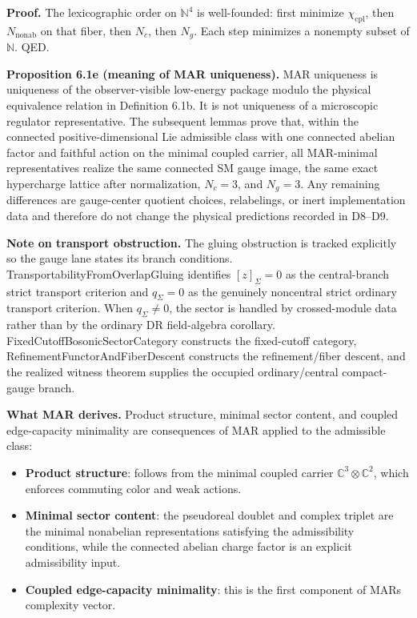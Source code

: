 \textbf{Proof.} The lexicographic order on \(\mathbb N^4\) is well-founded: first minimize \(\chi_{\mathrm{cpl}}\), then \(N_{\mathrm{nonab}}\) on that fiber, then \(N_c\), then \(N_g\). Each step minimizes a nonempty subset of \(\mathbb N\). QED.

\textbf{Proposition 6.1e (meaning of MAR uniqueness).} MAR uniqueness is uniqueness of the observer-visible low-energy package modulo the physical equivalence relation in Definition 6.1b. It is not uniqueness of a microscopic regulator representative. The subsequent lemmas prove that, within the connected positive-dimensional Lie admissible class with one connected abelian factor and faithful action on the minimal coupled carrier, all MAR-minimal representatives realize the same connected SM gauge image, the same exact hypercharge lattice after normalization, \(N_c=3\), and \(N_g=3\). Any remaining differences are gauge-center quotient choices, relabelings, or inert implementation data and therefore do not change the physical predictions recorded in D8--D9.

\textbf{Note on transport obstruction.} The gluing obstruction is tracked explicitly so the gauge lane states its branch conditions. TransportabilityFromOverlapGluing identifies \([z]_\Sigma=0\) as the central-branch strict transport criterion and \(q_\Sigma=0\) as the genuinely noncentral strict ordinary transport criterion. When \(q_\Sigma\ne0\), the sector is handled by crossed-module data rather than by the ordinary DR field-algebra corollary. FixedCutoffBosonicSectorCategory constructs the fixed-cutoff category, RefinementFunctorAndFiberDescent constructs the refinement/fiber descent, and the realized witness theorem supplies the occupied ordinary/central compact-gauge branch.

\textbf{What MAR derives.} Product structure, minimal sector content, and coupled edge-capacity minimality are consequences of MAR applied to the admissible class:

\begin{itemize}
\tightlist
\item
  \textbf{Product structure}: follows from the minimal coupled carrier \(\mathbb{C}^3 \otimes \mathbb{C}^2\), which enforces commuting color and weak actions.
\item
  \textbf{Minimal sector content}: the pseudoreal doublet and complex triplet are the minimal nonabelian representations satisfying the admissibility conditions, while the connected abelian charge factor is an explicit admissibility input.
\item
  \textbf{Coupled edge-capacity minimality}: this is the first component of MAR\textquotesingle s complexity vector.
\end{itemize}

